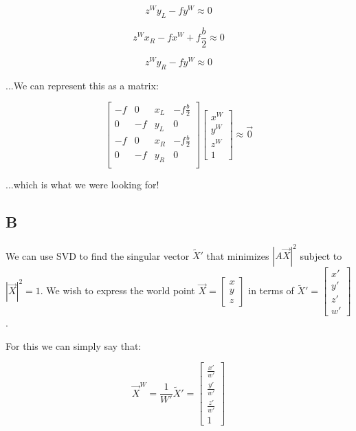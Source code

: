 \documentclass{article}
\begin{document}
\begin{equation}
    z^W y_L - f y^W \approx 0
\end{equation}

\begin{equation}
    z^W x_R - f x^W + f \frac{b}{2} \approx 0
\end{equation}

\begin{equation}
    z^W y_R - f y^W \approx 0
\end{equation}

\noindent ...We can represent this as a matrix:

\begin{equation}
    \begin{bmatrix}
        -f & 0 & x_L & -f \frac{b}{2}\\
        0 & -f & y_L & 0 \\
        -f & 0 & x_R & -f \frac{b}{2}\\
        0 & -f & y_R & 0 \\
    \end{bmatrix}\begin{bmatrix}
        x^W \\ y^W \\ z^W \\ 1
    \end{bmatrix}
    \approx \vec{0}
\end{equation}

\noindent ...which is what we were looking for!

\subsection*{B}

We can use SVD to find the singular vector $\tilde{X}'$ that minimizes $|A\vec{X}|^2$ subject to $|\vec{X}|^2=1$. We wish to express the world point $\vec{X}= \begin{bmatrix}
    x \\ y \\ z
\end{bmatrix}$ in terms of $\tilde{X}' = \begin{bmatrix}
    x' \\ y' \\ z' \\ w'
\end{bmatrix}$.

\noindent For this we can simply say that:

\begin{equation}
    \vec{X}^W = \frac{1}{W'} \tilde{X}' = \begin{bmatrix}
        \frac{x'}{w'} \\ \frac{y'}{w'} \\ \frac{z'}{w'} \\ 1
    \end{bmatrix}
\end{equation}
\end{document}
